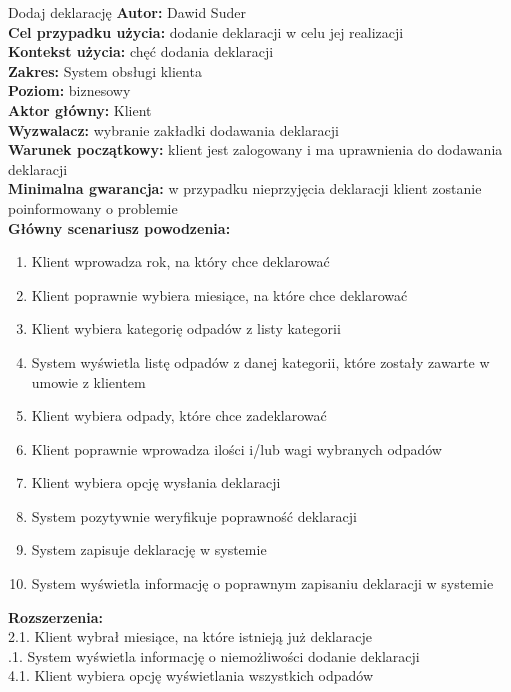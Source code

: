 \begin{usecase}{Dodaj deklarację}
	\textbf{Autor:} Dawid Suder \\
	\textbf{Cel przypadku użycia:} dodanie deklaracji w celu jej realizacji \\
	\textbf{Kontekst użycia:} chęć dodania deklaracji \\
	\textbf{Zakres:} System obsługi klienta \\
	\textbf{Poziom:} biznesowy \\
	\textbf{Aktor główny:} Klient \\
	\textbf{Wyzwalacz:} wybranie zakładki dodawania deklaracji \\
	\textbf{Warunek początkowy:} klient jest zalogowany i ma uprawnienia do dodawania deklaracji \\
	\textbf{Minimalna gwarancja:} w przypadku nieprzyjęcia deklaracji klient zostanie poinformowany o problemie \\
	\textbf{Główny scenariusz powodzenia:} \\
		\begin{enumerate}
			\item Klient wprowadza rok, na który chce deklarować
			\item Klient poprawnie wybiera miesiące, na które chce deklarować
			\item Klient wybiera kategorię odpadów z listy kategorii
			\item System wyświetla listę odpadów z danej kategorii, które zostały zawarte w umowie z klientem
			\item Klient wybiera odpady, które chce zadeklarować
			\item Klient poprawnie wprowadza ilości i/lub wagi wybranych odpadów
			\item Klient wybiera opcję wysłania deklaracji
			\item System pozytywnie weryfikuje poprawność deklaracji
			\item System zapisuje deklarację w systemie
			\item System wyświetla informację o poprawnym zapisaniu deklaracji w systemie
		\end{enumerate}
	\textbf{Rozszerzenia:} \\
		2.1. Klient wybrał miesiące, na które istnieją już deklaracje \\
			.1. System wyświetla informację o niemożliwości dodanie deklaracji \\
		4.1. Klient wybiera opcję wyświetlania wszystkich odpadów \\

\end{usecase}
